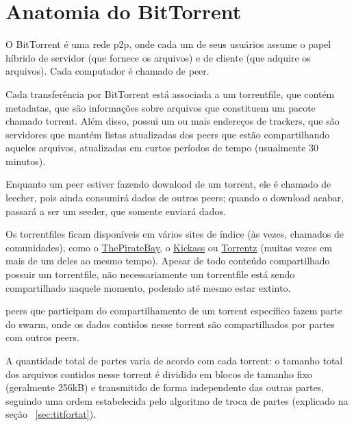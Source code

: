 
\chapter{Anatomia do BitTorrent}

O BitTorrent é uma rede \gls{p2p}, onde cada um de seus usuários assume o papel híbrido
de servidor (que fornece os arquivos) e de cliente (que adquire os arquivos). Cada
computador é chamado de \gls{peer}.

Cada transferência por BitTorrent está associada a um \gls{torrentfile}, que contém
\glspl{metadata}, que são informações sobre arquivos que constituem um pacote chamado
\gls{torrent}. Além disso, possui um ou mais endereços de \glspl{tracker}, que são
servidores que mantém listas atualizadas dos \glspl*{peer} que estão compartilhando
aqueles arquivos, atualizadas em curtos períodos de tempo (usualmente 30 minutos).

\begin{comment}
    \begin{figure}[ht!]
        \centering
        \fbox{\texttt{[image: funcionamento.png]}}
        \caption{esquema básico do funcionamento do BitTorrent}
        \label{fig:torrent-basics}
    \end{figure}
\end{comment}

Enquanto um \gls*{peer} estiver fazendo download de um \gls*{torrent}, ele é chamado de
\gls{leecher}, pois ainda consumirá dados de outros \glspl*{peer}; quando o download
acabar, passará a ser um \gls{seeder}, que somente enviará dados.

Os \glspl*{torrentfile} ficam disponíveis em vários sites de índice (às vezes, chamados
de comunidades), como o \href{http://thepiratebay.sx/}{ThePirateBay}, o
\href{http://kickass.to/}{Kickass} ou \href{https://torrentz.eu/}{Torrentz} (muitas
vezes em mais de um deles ao mesmo tempo). Apesar de todo conteúdo compartilhado possuir
um \gls*{torrentfile}, não necessariamente um \gls*{torrentfile} está sendo
compartilhado naquele momento, podendo até mesmo estar extinto.

\Glspl*{peer} que participam do compartilhamento de um \gls*{torrent} específico
fazem parte do \gls{swarm}, onde os dados contidos nesse \gls*{torrent} são
compartilhados por partes com outros \glspl*{peer}.

A quantidade total de partes varia de acordo com cada \gls*{torrent}: o tamanho total
dos arquivos contidos nesse \gls*{torrent} é dividido em blocos de tamanho fixo
(geralmente 256kB) e transmitido de forma independente das outras partes, seguindo uma
ordem estabelecida pelo algoritmo de troca de partes (explicado na seção
~\ref{sec:titfortat}).

